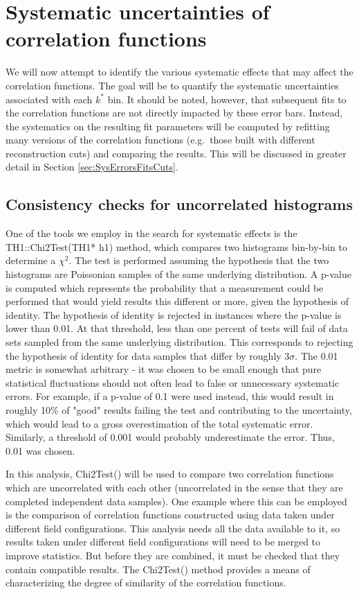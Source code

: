 \section{Systematic uncertainties of correlation functions}
\label{sec:SysUncertaintyCF}

We will now attempt to identify the various systematic effects that may affect the correlation functions.  
The goal will be to quantify the systematic uncertainties associated with each $k^*$ bin.  
It should be noted, however, that subsequent fits to the correlation functions are not directly impacted by these error bars.  
Instead, the systematics on the resulting fit parameters will be computed by refitting many versions of the correlation functions (e.g.\ those built with different reconstruction cuts) and comparing the results. 
This will be discussed in greater detail in Section \ref{sec:SysErrorsFitsCuts}.

\subsection{Consistency checks for uncorrelated histograms}
\label{sec:ConsistencyCheckUncorrelated}
One of the tools we employ in the search for systematic effects is the TH1::Chi2Test(TH1* h1) method, which compares two histograms bin-by-bin to determine a $\chi^2$.  
The test is performed assuming the hypothesis that the two histograms are Poissonian samples of the same underlying distribution.  
A p-value is computed which represents the probability that a measurement could be performed that would yield results this different or more, given the hypothesis of identity.  
The hypothesis of identity is rejected in instances where the p-value is lower than 0.01. 
At that threshold, less than one percent of tests will fail of data sets sampled from the same underlying distribution.  
This corresponds to rejecting the hypothesis of identity for data samples that differ by roughly $3 \sigma$.  
The 0.01 metric is somewhat arbitrary - it was chosen to be small enough that pure statistical fluctuations should not often lead to false or unnecessary systematic errors.  
For example, if a p-value of 0.1 were used instead, this would result in roughly 10\% of "good" results failing the test and contributing to the uncertainty, which would lead to a gross overestimation of the total systematic error.  
Similarly, a threshold of 0.001 would probably underestimate the error.  
Thus, 0.01 was chosen.

In this analysis, Chi2Test() will be used to compare two correlation functions which are uncorrelated with each other (uncorrelated in the sense that they are completed independent data samples).  
One example where this can be employed is the comparison of correlation functions constructed using data taken under different field configurations.  
This analysis needs all the data available to it, so results taken under different field configurations will need to be merged to improve statistics.  
But before they are combined, it must be checked that they contain compatible results.  
The Chi2Test() method provides a means of characterizing the degree of similarity of the correlation functions.  

